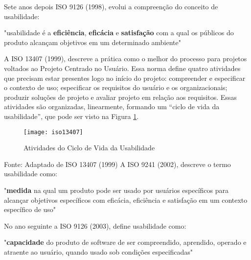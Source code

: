 \indent Sete anos depois ISO 9126 (1998), evolui a compreenção do conceito de usabilidade:\newline

	{\raggedleft
	\hspace*{4.5cm} 
	\begin{minipage}{0.7\textwidth} 
		"usabilidade é a \textbf{eficiência}, \textbf{eficácia} e \textbf{satisfação} com a qual os públicos do produto alcançam objetivos em um determinado ambiente"	
		\newline	
	\end{minipage}	
	\par}

\indent A ISO 13407 (1999), descreve a prática como o melhor do processo para projetos voltados ao Projeto Centrado no Usuário. Essa norma define quatro atividades que precisam estar presentes logo no início do projeto: compreender e especificar o contexto de uso; especificar os requisitos do usuário e os organizacionais; produzir soluções de projeto e avaliar projeto em relação aos requisitos. Essas atividades são organizadas, linearmente, formando um “ciclo de vida da usabilidade”, que pode ser visto na Figura \ref{fig:iso13407}. 
\begin{figure}[H]
	\centering	
	\caption{Atividades do Ciclo de Vida da Usabilidade}
	\texttt{[image: iso13407]}
	\label{fig:iso13407}
\end{figure} %
\vspace{-0.8 cm} Fonte: Adaptado de ISO 13407 (1999)\newline
\indent A ISO 9241 (2002), descreve o termo usabilidade como:\newline

	{\raggedleft
	\hspace*{4.5cm} 
	\begin{minipage}{0.7\textwidth} 
		"\textbf{medida} na qual um produto pode ser usado por usuários específicos para alcançar objetivos específicos com eficácia, eficiência e satisfação em um contexto específico de uso"	
		\newline	
	\end{minipage}	
	\par}

\indent No ano seguinte a ISO 9126 (2003), define usabilidade como:\newline

	{\raggedleft
	\hspace*{4.5cm} 
	\begin{minipage}{0.7\textwidth} 
		"\textbf{capacidade} do produto de software de ser compreendido, aprendido, operado e atraente ao usuário, quando usado sob condições especificadas"	
		\newline	
	\end{minipage}
	\par}

